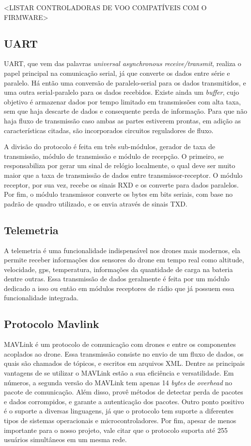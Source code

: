 \documentclass[12pt,a4paper,oneside]{book}
\begin{document}
<LISTAR CONTROLADORAS DE VOO COMPATÍVEIS COM O FIRMWARE>


\subsection{UART}

UART, que vem das palavras \textit{universal asynchronous receive/transmit}, realiza o papel principal na comunicação serial, já que converte os dados entre série e paralelo. Há então uma conversão de paralelo-serial para os dados transmitidos, e uma outra serial-paralelo para os dados recebidos. Existe ainda um \textit{buffer}, cujo objetivo é armazenar dados por tempo limitado em transmissões com alta taxa, sem que haja descarte de dados e consequente perda de informação. Para que não haja fluxo de transmissão caso ambas as partes estiverem prontas, em adição as características citadas, são incorporados circuitos reguladores de fluxo.

A divisão do protocolo é feita em três sub-módulos, gerador de taxa de transmissão, módulo de transmissão e módulo de recepção. O primeiro, se responsabiliza por gerar um sinal de relógio localmente, o qual deve ser muito maior que a taxa de transmissão de dados entre transmissor-receptor. O módulo receptor, por sua vez, recebe os sinais RXD e os converte para dados paralelos. Por fim, o módulo transmissor converte os bytes em bits seriais, com base no padrão de quadro utilizado, e os envia através de sinais TXD. \cite{uart}

\subsection{Telemetria}

A telemetria é uma funcionalidade indispensável nos drones mais modernos, ela permite receber informações dos sensores do drone em tempo real como altitude, velocidade, gps, temperatura, informações da quantidade de carga na bateria dentre outras. Essa transmissão de dados geralmente é feita por um módulo dedicado a isso ou então em módulos receptores de rádio que já possuem essa funcionalidade integrada.

\subsection{Protocolo Mavlink}

MAVLink é um protocolo de comunicação com drones e entre os componentes acoplados ao drone. Essa transmissão consiste no envio de um fluxo de dados, os quais são chamados de tópicos, e escritos em arquivos XML. Dentre as principais vantagens de se utilizar o MAVLink estão a sua eficiência e versatilidade. Em números, a segunda versão do MAVLink tem apenas 14 \textit{bytes} de \textit{overhead} no pacote de comunicação. Além disso, provê métodos de detectar perda de pacotes e dados corrompidos, e garante a autenticação dos pacotes. Outro ponto positivo é o suporte a diversas linguagens, já que o protocolo tem suporte a diferentes tipos de sistemas operacionais e microcontroladores. Por fim, apesar de menos importante para o nosso projeto, vale citar que o protocolo suporta até 255 usuários simultâneos em um mesma rede.
\cite{mavlink}
\end{document}
